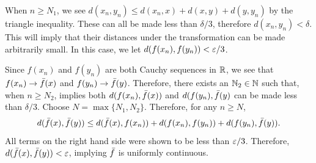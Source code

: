 \begin{solution}
\begin{itemize}[-]
        \jump
        When $n \geq N_1$, we see $d(x_n, y_n) \leq d(x_n, x) + d(x, y) + d(y, y_n)$ by the triangle inequality. These can all be made less than $\delta / 3$, therefore $d(x_n, y_n) < \delta$. This will imply that their distances under the transformation can be made arbitrarily small. In this case, we let $d(f(x_n), f(y_n)) < \varepsilon / 3$. \par

        \jump
        Since $f(x_n)$ and $f(y_n)$ are both Cauchy sequences in $\mathbb{R}$, we see that $f(x_n) \rightarrow \Bar{f}(x)$ and $f(y_n) \rightarrow \Bar{f}(y)$. Therefore, there exists an $\mathbb{N}_2 \in \mathbb{N}$ such that, when $n \geq N_2$, implies both $d(f(x_n), \Bar{f}(x))$ and $d(f(y_n), \Bar{f}(y)$ can be made less than $\delta / 3$. Choose $N = \max \{ N_1, N_2 \}$. Therefore, for any $n \geq N$, 
        \[d(\Bar{f}(x), \Bar{f}(y)) \leq d(\Bar{f}(x), f(x_n)) + d(f(x_n), f(y_n)) + d(f(y_n), \Bar{f}(y)).\]
        All terms on the right hand side were shown to be less than $\varepsilon / 3$. Therefore, $d(\Bar{f}(x), \Bar{f}(y)) < \varepsilon$, implying $\Bar{f}$ is uniformly continuous.
    \end{itemize}
\end{solution}

\newpage
